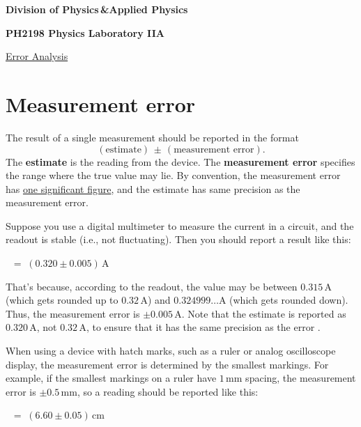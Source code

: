 \documentclass[11pt,a4paper]{article}
\begin{document}
\begin{center}
\textbf{Division of Physics\;\,\&\;Applied Physics}

\textbf{PH2198 Physics Laboratory IIA}

\vskip 0.05in

\underline{\Huge Error Analysis}
\end{center}

\section{Measurement error}

The result of a single measurement should be reported in the format
\begin{equation*}
  (\textrm{estimate})\, \pm\, (\textrm{measurement error}).
\end{equation*}
The \textbf{estimate} is the reading from the device.  The
\textbf{measurement error} specifies the range where the true value
may lie.  By convention, the measurement error has \underline{one
  significant figure}, and the estimate has same precision as the
measurement error.

Suppose you use a digital multimeter to measure the current in a
circuit, and the readout is stable (i.e., not fluctuating).  Then you
should report a result like this:
\begin{center}
$\;\;=\; \left(0.320 \pm 0.005\right) \, \mathrm{A}$
\end{center}
That's because, according to the readout, the value may be between
$0.315\,\mathrm{A}$ (which gets rounded up to $0.32\,\mathrm{A}$) and
$0.324999\dots\mathrm{A}$ (which gets rounded down).  Thus, the
measurement error is $\pm 0.005 \, \mathrm{A}$.  Note that the
estimate is reported as $0.320 \,\mathrm{A}$, not $0.32\,\mathrm{A}$,
to ensure that it has the same precision as the error \cite{Hughes}.

When using a device with hatch marks, such as a ruler or analog
oscilloscope display, the measurement error is determined by the
smallest markings.  For example, if the smallest markings on a ruler
have $1\,\mathrm{mm}$ spacing, the measurement error is $\pm 0.5
\,\textrm{mm}$, so a reading should be reported like this:
\begin{center}
$\;\;=\; \left(6.60 \pm 0.05\right) \, \mathrm{cm}$
\end{center}
\end{document}
